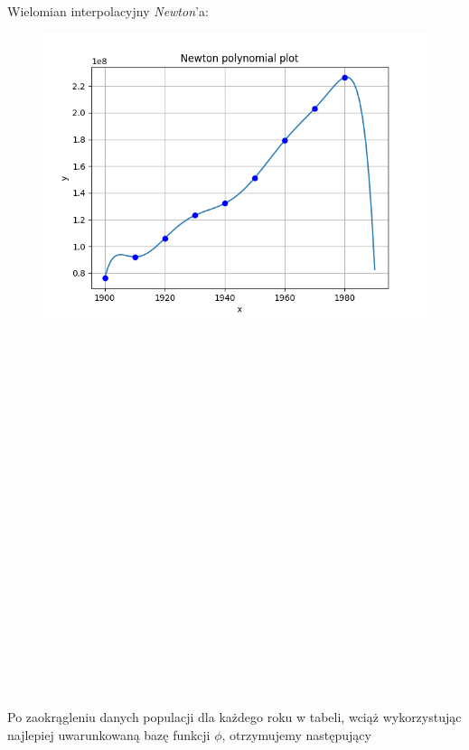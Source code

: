 \documentclass{article}
\begin{document}
\\\\\\\\\\\\\\\\\\\\\\
Wielomian interpolacyjny \textit{Newton}'a:
\begin{figure}[ht!]
  \includegraphics[width=\linewidth]{figures/newton.png}
\end{figure}
\\\\\\\\\\\\\\\\\\\\\\\\\\\\\\\\\\\\\\\\\\
Po zaokrągleniu danych populacji dla każdego roku w tabeli, wciąż wykorzystując 
najlepiej uwarunkowaną bazę funkcji $\phi$, otrzymujemy następujący 
\end{document}
